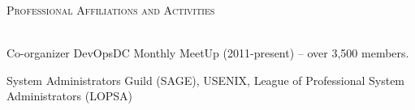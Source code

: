 \documentclass{article}
\newcommand{\lineunder}{\vspace*{-8pt} \\ \hspace*{-18pt} \hrulefill \\}
\newcommand{\header}[1]{{\hspace*{-15pt}\vspace*{6pt} \textsc{#1}} \vspace*{-6pt} \lineunder}
\newenvironment{achievements}{\begin{list}{\topsep 0pt \itemsep -2pt}} {\vspace*{4pt}\end{list}}
\begin{document}
\header{Professional Affiliations and Activities}
\begin{achievements}
\item Co-organizer DevOpsDC Monthly MeetUp (2011-present) -- over 3,500 members.
\item System Administrators Guild (SAGE), USENIX, League of Professional System Administrators (LOPSA)
\end{achievements}




\end{document}
